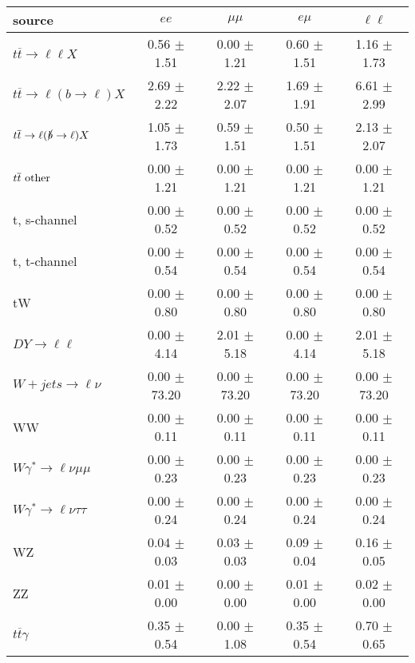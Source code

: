\begin{tabular}{l|cccc} \hline\hline
source & $ee$ & $\mu\mu$ & $e\mu$ & $\ell\ell $ \\
\hline
$t\overline{t} \rightarrow \ell \ell X$ &  0.56 $\pm$  1.51 &  0.00 $\pm$  1.21 &  0.60 $\pm$  1.51 &  1.16 $\pm$  1.73 \\
$t\overline{t} \rightarrow \ell (b \rightarrow \ell) X$ &  2.69 $\pm$  2.22 &  2.22 $\pm$  2.07 &  1.69 $\pm$  1.91 &  6.61 $\pm$  2.99 \\
$t\overline{t} \rightarrow \ell (\slashed b \rightarrow \ell) X$ &  1.05 $\pm$  1.73 &  0.59 $\pm$  1.51 &  0.50 $\pm$  1.51 &  2.13 $\pm$  2.07 \\
        $t\overline{t}\ \rm{other}$ &  0.00 $\pm$  1.21 &  0.00 $\pm$  1.21 &  0.00 $\pm$  1.21 &  0.00 $\pm$  1.21 \\
\hline
                       t, s-channel &  0.00 $\pm$  0.52 &  0.00 $\pm$  0.52 &  0.00 $\pm$  0.52 &  0.00 $\pm$  0.52 \\
                       t, t-channel &  0.00 $\pm$  0.54 &  0.00 $\pm$  0.54 &  0.00 $\pm$  0.54 &  0.00 $\pm$  0.54 \\
                                 tW &  0.00 $\pm$  0.80 &  0.00 $\pm$  0.80 &  0.00 $\pm$  0.80 &  0.00 $\pm$  0.80 \\
\hline
         $DY \rightarrow \ell \ell$ &  0.00 $\pm$  4.14 &  2.01 $\pm$  5.18 &  0.00 $\pm$  4.14 &  2.01 $\pm$  5.18 \\
      $W+jets \rightarrow \ell \nu$ &  0.00 $\pm$ 73.20 &  0.00 $\pm$ 73.20 &  0.00 $\pm$ 73.20 &  0.00 $\pm$ 73.20 \\
                                 WW &  0.00 $\pm$  0.11 &  0.00 $\pm$  0.11 &  0.00 $\pm$  0.11 &  0.00 $\pm$  0.11 \\
\hline
$W\gamma^{*} \rightarrow \ell \nu \mu\mu$ &  0.00 $\pm$  0.23 &  0.00 $\pm$  0.23 &  0.00 $\pm$  0.23 &  0.00 $\pm$  0.23 \\
$W\gamma^{*} \rightarrow \ell \nu \tau\tau$ &  0.00 $\pm$  0.24 &  0.00 $\pm$  0.24 &  0.00 $\pm$  0.24 &  0.00 $\pm$  0.24 \\
                                 WZ &  0.04 $\pm$  0.03 &  0.03 $\pm$  0.03 &  0.09 $\pm$  0.04 &  0.16 $\pm$  0.05 \\
                                 ZZ &  0.01 $\pm$  0.00 &  0.00 $\pm$  0.00 &  0.01 $\pm$  0.00 &  0.02 $\pm$  0.00 \\
\hline
              $t\overline{t}\gamma$ &  0.35 $\pm$  0.54 &  0.00 $\pm$  1.08 &  0.35 $\pm$  0.54 &  0.70 $\pm$  0.65 \\

\end{tabular}
